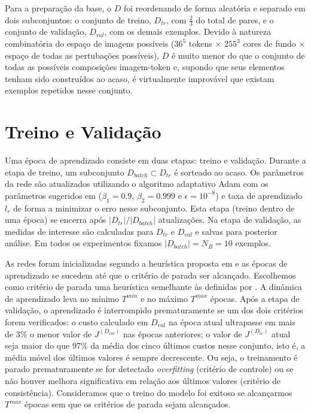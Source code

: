 Para a preparação da base, o $D$ foi reordenando de forma aleatória e separado em dois subconjuntos: o conjunto de treino, $D_{tr}$, com $\frac{2}{3}$ do total de pares, e o conjunto de validação, $D_{val}$, com os demais exemplos. Devido à natureza combinatória do espaço de imagens possíveis ($36^5$ tokens $\times$ $255^3$ cores de fundo $\times$ espaço de todas as pertubações possíveis), $D$ é muito menor do que o conjunto de todas as possíveis composições imagem-token e, supondo que seus elementos tenham sido construídos ao acaso, é virtualmente improvável que existam exemplos repetidos nesse conjunto.

\section{Treino e Validação}\label{sec:treio_validacao}

Uma época de aprendizado consiste em duas etapas: treino e validação. Durante a etapa de treino, um subconjunto $D_{batch} \subset D_{tr}$ é sorteado ao acaso. Os parâmetros da rede são atualizados utilizando o algoritmo adaptativo Adam com os parâmetros sugeridos em \cite{adam_op} ($\beta_1 = 0.9$, $\beta_2 = 0.999$ e $\epsilon = 10^{-8}$) e taxa de aprendizado $l_r$ de forma a minimizar o erro nesse subconjunto. Esta etapa (treino dentro de uma época) se encerra após $|D_{tr}|/|D_{batch}|$ atualizações. Na etapa de validação, as medidas de interesse são calculadas para $D_{tr}$ e $D_{val}$ e salvas para posterior análise. Em todos os experimentos fixamos $|D_{batch}| = N_B = 10$ exemplos.

As redes foram inicializadas segundo a heurística proposta em \cite{HeZR015relu} e as épocas de aprendizado se sucedem até que o critério de parada ser alcançado. Escolhemos como critério de parada uma heurística semelhante às definidas por \cite{lutz_early_stop}. A dinâmica de aprendizado leva no mínimo $T^{min}$ e no máximo $T^{max}$ épocas. Após a etapa de validação, o aprendizado é interrompido prematuramente se um dos dois critérios forem verificados: o custo calculado em $D_{val}$ na época atual ultrapasse em mais de $3\%$ o menor valor de $J^{(D_{val})}$ nas épocas anteriores; o valor de $J^{(D_{tr})}$ atual seja maior do que $97\%$ da média dos cinco últimos custos nesse conjunto, isto é, a média móvel dos últimos valores é sempre decrescente. Ou seja, o treinamento é parado prematuramente se for detectado \textit{overfitting} (critério de controle) ou se não houver melhora significativa em relação aos últimos valores (critério de consistência). Consideramos que o treino do modelo foi exitoso se alcançarmos $T^{max}$ épocas sem que os critérios de parada sejam alcançados.

